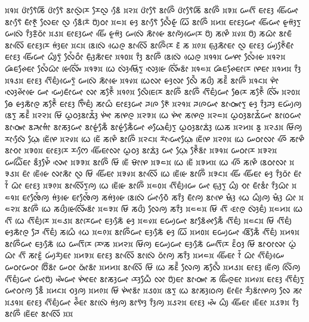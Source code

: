 \noindent
᰿᱁᰿ ᰂᰦᰮᰛᰧᰶᰕᰩ ᰂᰦᰮᰛᰧᰶ ᰣᰦᰜᰬᰮᰌᰨ ᰌᰧᰜᰬ ᰣᰧᰵᰶ ᰿᱂᰿ ᰂᰦᰮᰛᰧᰶ ᰣᰦᰍᰩᰮ ᰂᰦᰮᰛᰧᰶᰕᰩ ᰣᰦᰍᰩᰮ ᰿᱃᰿ ᰠᰛᰩᰵ ᰀᰦᰚᰫ ᰀᰤᰩᰵᰠᰦ ᰣᰦᰛᰧᰵᰶ ᰀᰦᰳᰉᰬᰳ ᰜᰧᰀᰦ ᰜᰬ ᰣᰧᰵᰶᰌᰨᰮ ᰗᰪᰮᰓᰦ ᰿᱄᰿ ᰡᰫ ᰣᰦᰛᰧᰵᰶ ᰜᰧᰰᰶᰡᰬᰳ ᰃᰩ ᰣᰦᰍᰩᰮ ᰿᱅᰿ ᰀᰦᰚᰫᰠᰦ ᰀᰤᰩᰵᰠᰦ ᰡᰬᰙᰫᰮᰛᰬ ᰠᰜᰨᰮ ᰅᰫᰰᰌᰬᰳᰓᰦᰮ ᰿᱆᰿ ᰀᰦᰚᰫᰠᰦ ᰀᰤᰩᰵ ᰡᰬᰙᰫᰮ ᰠᰜᰨᰮ ᰕᰦᰳᰡᰴ ᰣᰦᰍᰪᰮᰠᰴᰌᰨ ᰗᰪᰮ ᰕᰋᰨᰰ ᰿᱇᰿ ᰗᰪᰮ ᰕᰃᰦᰳ ᰣᰦᰀᰶ ᰣᰦᰜᰩᰵ ᰀᰦᰚᰫᰌᰨ ᰙᰫᰭᰀᰦ ᰿᱈᰿ ᰣᰨᰜᰨᰮ ᰃᰴᰍᰬ ᰣᰦᰜᰩᰵ ᰣᰦᰍᰩᰮᰌᰨ ᰚᰶ ᰕ ᰿᱉᰿ ᰀ᰷ᰥᰫᰕᰦᰳᰀᰦ ᰜᰬ ᰀᰦᰚᰫ ᰠᰪᰭᰉᰧᰮᰶᰀᰦᰳ ᰀᰦᰚᰫ ᰀᰤᰩᰵᰠᰦ ᰃᰪᰰᰛᰬᰮ ᰜᰧᰭᰶᰓᰦᰰ ᰀ᰷ᰥᰫᰳᰕᰦᰳᰀᰦ ᰿᱁᱀᰿ ᰅᰫᰰ ᰣᰦᰍᰩᰮ ᰣᰨᰜᰨᰮ ᰃᰴᰍᰬ ᰿᱁᱁᰿ ᰠᰋᰦ ᰜᰧᰭᰶᰡᰴ ᰿᱁᱂᰿ ᰘᰶᰀᰊᰧᰀᰦ ᰜᰧᰭᰶᰃᰦᰳ ᰡᰨᰜᰤᰩᰭ ᰿᱁᱃᰿ ᰃᰨ ᰜᰫᰭᰝᰥᰩᰵᰛᰬ ᰜᰫᰵᰡᰨ ᰜᰤᰩᰭᰣᰦᰮ ᰿᱁᱄᰿ ᰘᰶᰀᰊᰧᰀᰦᰌᰨ ᰋᰨᰀᰦ ᰿᱁᱅᰿ ᰅᰫᰰ ᰿᱁᱆᰿ ᰀᰦᰚᰫ ᰛᰩᰵᰀᰪᰱᰠᰴᰛᰬᰮ ᰠᰜᰨᰮ ᰕᰦᰳᰡᰴ ᰿᱁᱇᰿ ᰃᰨᰜᰦ ᰡᰫᰜᰦ ᰜᰧᰰᰶ ᰕᰂᰪᰰ ᰕᰚᰰᰶ ᰣᰦᰍᰩᰮ ᰿᱁᱈᰿ ᰋᰦᰯ ᰜᰫᰵᰊᰦᰲᰡᰴ ᰠᰦ ᰠᰪᰵᰀᰦᰳᰠᰦ ᰜᰦ ᰕᰉᰧᰰᰶ ᰿᱁᱉᰿ ᰜᰧᰰᰀᰨᰌᰨ ᰣᰦᰍᰩᰮ ᰣᰦᰍᰩᰮ ᰛᰩᰵᰀᰪᰱᰠᰦ ᰟᰧᰌᰨ ᰕᰉᰧᰰᰶ ᰜᰤᰩᰭ ᰿᱂᱀᰿ ᰟᰧ ᰡᰫᰕᰦᰳᰍᰬ ᰕᰉᰧᰰᰶ ᰀᰦᰚᰫ ᰛᰤᰩᰳᰀᰪᰱ ᰕᰦᰃᰰ ᰀᰦᰚᰫᰠᰦ ᰎᰍᰨ ᰉᰧᰶ ᰿᱂᱁᰿ ᰎᰍᰨᰠᰦ ᰣᰦᰓᰥᰤᰦᰵᰛᰬ ᰡᰫ ᰅᰫᰰᰎᰫ ᰀᰠᰪᰮᰍᰪ ᰣᰨᰛᰬ ᰕᰚᰰᰶ ᰿᱂᱂᰿ ᰝᰩ ᰃᰬᰓᰫᰣᰦᰇᰫᰭᰶ ᰋᰤᰦᰭ ᰕᰋᰨᰍᰬ ᰿᱂᱃᰿ ᰃᰨ ᰋᰤᰦᰭ ᰕᰋᰨᰍᰬ ᰿᱂᱄᰿ ᰃᰬᰓᰫᰣᰦᰇᰭᰶᰠᰦ ᰣᰦᰓᰨᰠᰦ ᰣᰦᰓᰥᰤᰦᰵ ᰣᰎᰥᰦᰙᰦᰱ ᰣᰦᰕᰫᰠᰦ ᰣᰦᰡᰬᰭᰕᰧᰳᰶ ᰣᰦᰡᰬᰭᰕᰧᰳᰶᰠᰦ ᰊᰃᰥᰧᰀᰪᰱᰛᰬ ᰃᰬᰓᰫᰣᰦᰇᰫᰭ ᰃᰨᰕ ᰿᱂᱅᰿ ᰣᰬ ᰿᱂᱆᰿ ᰝᰩᰍᰪ ᰌᰦᰜᰧᰵᰶ ᰃ᰷ᰥᰧ ᰀᰨᰲᰋᰨ ᰿᱂᱇᰿ ᰃᰨ ᰀᰨᰲ ᰕᰋᰨᰰ ᰣᰦᰍᰩᰮ ᰿᱂᱈᰿ ᰌᰦᰮᰠᰦᰵᰃ᰷ᰥᰧ ᰀᰨᰲᰋᰨ ᰿᱂᱉᰿ ᰃᰨ ᰠᰓᰦᰜᰦ ᰍᰩᰵ ᰕᰦᰋᰰ ᰣᰦᰆᰦ ᰿᱃᱀᰿ ᰀᰦᰚᰫᰌᰨ ᰌᰔᰧᰵ ᰀᰤᰩᰵᰀᰦᰜᰦ ᰃᰬᰓᰫ ᰣᰦᰇᰫᰭ ᰠᰦ ᰃ᰷ᰥᰧ ᰉᰧᰰᰶᰣᰦᰮ ᰿᱃᱁᰿ ᰠᰓᰦᰌᰨ ᰿᱃᱂᰿ ᰠᰃᰩᰲᰀᰦ ᰣᰫᰰᰋᰧᰭᰶ ᰜᰤᰦᰵ ᰿᱃᱃᰿ ᰣᰦᰍᰩᰮ ᰝᰩ ᰀᰨᰲ ᰝᰦᰳᰋᰨ ᰿᱃᱄᰿ ᰃᰨ ᰀᰨᰲ ᰿᱃᱅᰿ ᰃᰨ ᰍᰩᰵ ᰕᰋᰨᰰ ᰣᰨᰓᰦᰜᰦ ᰿᱃᱆᰿ ᰀᰦᰮ ᰀᰨᰲᰡᰴ ᰜᰦᰕᰦᰳ ᰜᰬ ᰝᰩ ᰀᰤᰩᰵᰀᰦ ᰿᱃᱇᰿ ᰣᰦᰜᰩᰵ ᰃᰨ ᰀᰨᰲᰡᰨ ᰣᰦᰍᰩᰮ ᰿᱃᱈᰿ ᰀᰤᰩᰵ ᰀᰤᰩᰵᰀᰦ ᰡᰫ ᰅᰫᰰᰓᰦᰮ ᰀᰦᰮ ᰅᰭᰶ ᰃᰦᰳ ᰀᰦᰚᰫ ᰿᱃᱉᰿ ᰣᰦᰜᰩᰵᰛᰬᰍᰪ ᰃᰨ ᰀᰨᰲᰡᰨ ᰣᰦᰍᰩᰮ ᰿᱄᱀᰿ ᰛᰩᰵᰀᰪᰱᰠᰴ ᰠᰦ ᰀ᰷ᰥᰫᰛᰬ ᰃᰪᰰ ᰆᰦ ᰀᰦᰳᰣᰦᰱ ᰅᰫᰰᰃᰦᰳ ᰿᱄᱁᰿ ᰀᰦᰒᰧᰭᰶᰍᰪ ᰙᰫᰭᰡᰴ ᰀᰦᰒᰧᰭᰶᰍᰪ ᰕᰙᰫᰭᰡᰴ ᰣᰨᰜᰨᰮ ᰠᰦᰭᰆᰧᰵᰶ ᰕᰅᰫᰰ ᰀᰦᰳᰍᰪ ᰣᰦᰋᰨᰵ ᰝᰥᰫᰱ ᰃᰴ ᰃᰪᰰᰍᰪ ᰝᰥᰫᰱ ᰃᰦᰳ ᰿᱄᱂᰿ ᰣᰦᰍᰩᰮ ᰃᰨ ᰕᰂᰪᰰᰡᰨᰜᰤᰩᰭᰣᰦᰮ ᰿᱄᱃᰿ ᰝᰩ ᰕᰂᰪᰰ ᰜᰧᰍᰪ ᰕᰅᰫᰰ ᰿᱄᱄᰿ ᰝᰩ ᰛᰩᰵ ᰚᰦᰵᰍᰬ ᰜᰫᰮᰀᰪᰱ ᰿᱄᱅᰿ ᰃᰨ ᰛᰩᰵ ᰃᰨ ᰛᰩᰵᰀᰪᰱᰌᰨ ᰿᱄᱆᰿ ᰣᰦᰌᰨᰠᰦ ᰀᰫᰕᰧᰵᰶ ᰡᰫ ᰿᱄᱇᰿ ᰀᰠᰪᰠᰦ ᰣᰦᰣᰧᰶᰊᰦᰕᰧᰳᰶ ᰛᰩᰵᰀᰪᰱ ᰿᱄᱈᰿ ᰝᰩ ᰛᰩᰵᰀᰪᰱ ᰡᰫᰕᰦᰳᰍᰬ ᰎᰧ ᰛᰩᰵᰀᰪᰱ ᰕᰃᰨᰰ ᰃᰴ ᰿᱄᱉᰿ ᰣᰦᰍᰩᰮᰠᰦ ᰀᰫᰕᰧᰵᰶ ᰡᰫ ᰃᰩ ᰿᱅᱀᰿ ᰀᰠᰪᰠᰦ ᰣᰩᰵᰕᰧᰳᰶ ᰛᰩᰵᰀᰪᰱ ᰿᱅᱁᰿ ᰣᰦᰍᰩᰮᰠᰦ ᰀᰫᰕᰧᰵᰶ ᰃᰨ ᰠᰛᰩᰵᰌᰨ ᰌᰤᰨᰕ ᰿᱅᱂᰿ ᰝᰩᰍᰪ ᰀᰠᰪᰠᰦ ᰀᰫᰕᰧᰵᰶ ᰠᰛᰩᰵᰌᰨ ᰚᰮᰶᰓᰫ ᰝᰩ ᰣᰦᰆᰦᰜᰦ ᰃᰬᰭ ᰃᰦᰳ ᰛᰩᰵ ᰕᰦᰚᰬᰯ ᰠᰪᰭᰌᰪᰮᰀᰦ ᰿᱅᱃᰿ ᰀᰦᰚᰫ ᰣᰦᰜᰩᰵ ᰣᰦᰜᰨᰮ ᰓᰦᰮᰍᰪ ᰕᰅᰫᰰ ᰿᱅᱄᰿ ᰀᰤᰩᰵᰀᰦ ᰅᰭᰶ ᰃᰦᰳ ᰛᰩᰵᰀᰪᰱᰠᰴ ᰠᰓᰦᰠᰓᰦ ᰗᰩᰮᰣᰦᰮ ᰠᰓᰦ ᰓᰥᰦᰮᰣᰦᰮ ᰿᱅᱅᰿ ᰣᰦᰜᰩᰵ ᰝᰩ ᰃᰨ ᰕᰚᰰᰶ ᰜᰧᰍᰪ ᰕᰜᰧᰰᰶ ᰿᱅᱆᰿ ᰀᰦᰚᰫ ᰀᰨᰲᰍᰪ ᰜᰩᰮᰍᰪ ᰛᰩᰵᰀᰪᰱᰠᰦ ᰠᰦᰭᰗᰪᰮ ᰊᰤᰵᰶᰠᰦ ᰋᰤᰦᰭᰀᰦ ᰣᰦᰕᰫᰠᰦ ᰌᰫᰵᰃᰧᰳᰶ ᰜᰦ ᰗᰪᰮᰀᰦ ᰣᰦᰓᰥᰤᰦᰵ ᰕ ᰀᰤᰩᰯᰍᰬᰀᰦ ᰿᱅᱇᰿ ᰀᰦᰚᰫ ᰛᰩᰵᰀᰪᰱᰛᰬ ᰠᰦᰓᰦᰍᰪ ᰣᰧᰳᰶ ᰿᱅᱈᰿ ᰆᰫᰍᰪ ᰿᱅᱉᰿ ᰝᰩ ᰋᰤᰦᰭᰣᰦᰮ ᰿᱆᱀᰿ ᰣᰨᰛᰬ ᰃᰨ ᰣᰦᰕᰫᰓᰨᰍᰪ ᰀᰦᰮᰀᰦᰮ ᰌᰪᰰᰣᰦᰮᰋᰨᰍᰪ ᰜᰧ ᰕᰦ ᰿᱆᱁᰿ ᰀᰦᰚᰫ ᰛᰩᰵᰀᰪᰱᰠᰦ ᰊᰰᰶᰀᰦ ᰣᰦᰜᰨᰮ ᰙᰫᰭᰍᰪ ᰣᰦᰛᰤᰫᰮ ᰅᰫᰰᰍᰪ ᰿᱆᱂᰿ ᰀᰦᰚᰫ ᰊᰤᰵᰶ ᰃᰪᰰ ᰀᰤᰩᰵᰀᰦ ᰀᰨᰲᰀᰦ ᰿᱆᱃᰿ ᰅᰫᰰ ᰣᰦᰍᰩᰮ ᰀᰨᰲᰀᰦ ᰣᰦᰜᰩᰵ ᰿᰿

\noindent

\noindent
\bye
